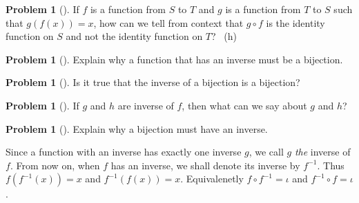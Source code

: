 \documentclass[10pt,]{book}
\theoremstyle{plain}
\theoremstyle{definition}
\newtheorem{activity}[project]{Problem}
\theoremstyle{definition}
\numberwithin{equation}{chapter}
\begin{document}
\begin{activity}[]\marginsymbol[-1em]{} \label{activity-339}
\hypertarget{p-1911}{}%
If \(f\) is a function from \(S\) to \(T\) and \(g\) is a function from \(T\) to \(S\) such that \(g(f(x)) = x\), how can we tell from context that \(g\circ f\) is the identity function on \(S\) and not the identity function on \(T\)?%
~{\tiny (h)}\end{activity}
\begin{activity}[]\marginsymbol[-1em]{} \label{inversetobijection}
\hypertarget{p-1914}{}%
Explain why a function that has an inverse must be a bijection.%
\end{activity}
\begin{activity}[]\marginsymbol[-1em]{} \label{activity-341}
\hypertarget{p-1916}{}%
Is it true that the inverse of a bijection is a bijection?%
\end{activity}
\begin{activity}[]\marginsymbol[-1em]{} \label{activity-342}
\hypertarget{p-1918}{}%
If \(g\) and \(h\) are inverse of \(f\), then what can we say about \(g\) and \(h\)?%
\end{activity}
\begin{activity}[]\marginsymbol[-1em]{} \label{activity-343}
\hypertarget{p-1920}{}%
Explain why a bijection must have an inverse.%
\end{activity}
\hypertarget{p-1922}{}%
Since a function with an inverse has exactly one inverse \(g\), we call \(g\) \emph{the} inverse of \(f\).  From now on, when \(f\) has an inverse, we shall denote its inverse by \(f^{-1}\).  Thus \(f(f^{-1}(x)) = x\) and \(f^{-1}(f(x)) = x\).  Equivalenetly \(f\circ f^{-1} = \iota\) and \(f^{-1} \circ f = \iota\).%
\typeout{************************************************}
\typeout{************************************************}
\end{document}
